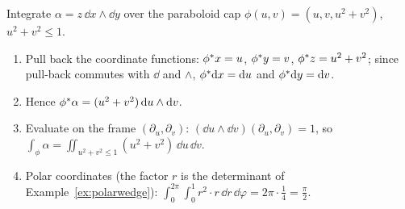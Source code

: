 \begin{example}\label{ex:paraboloid}
Integrate $\alpha=z\,\dd x\wedge\dd y$ over the paraboloid cap $\phi(u,v)=(u,v,u^2+v^2)$, $u^2+v^2\le1$.
\begin{enumerate}
\item Pull back the coordinate functions: $\phi{}^{*} x=u$, $\phi{}^{*} y=v$, $\phi{}^{*} z=u^2+v^2$; since pull-back commutes with $\dd$ and $\wedge$, $\phi{}^{*}\mathrm{d} x=\mathrm{d} u$ and $\phi{}^{*}\mathrm{d} y=\mathrm{d} v$.
\item Hence $\phi{}^{*}\alpha=(u^2+v^2)\,\mathrm{d} u\wedge\mathrm{d} v$.
\item Evaluate on the frame $(\partial_u,\partial_v)$: $(\dd u\wedge\dd v)(\partial_u,\partial_v)=1$, so $\int_\phi\alpha=\iint_{u^2+v^2\le1}(u^2+v^2)\,\dd u\,\dd v$.
\item Polar coordinates (the factor $r$ is the determinant of Example~\ref{ex:polarwedge}): $\displaystyle\int_0^{2\pi}\!\!\int_0^1r^2\cdot r\,\dd r\,\dd\varphi=2\pi\cdot\tfrac14=\tfrac\pi2$.
\end{enumerate}
\end{example}

